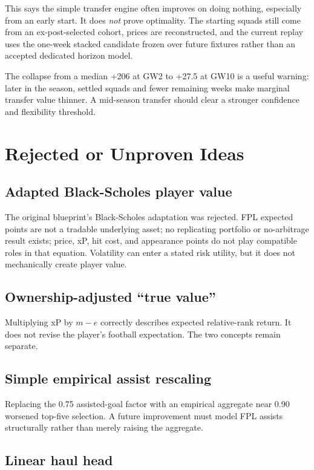 \documentclass[11pt,a4paper]{article}
\begin{document}
This says the simple transfer engine often improves on doing nothing, especially from an early start. It does \emph{not} prove optimality. The starting squads still come from an ex-post-selected cohort, prices are reconstructed, and the current replay uses the one-week stacked candidate frozen over future fixtures rather than an accepted dedicated horizon model.

The collapse from a median +206 at GW2 to +27.5 at GW10 is a useful warning: later in the season, settled squads and fewer remaining weeks make marginal transfer value thinner. A mid-season transfer should clear a stronger confidence and flexibility threshold.

\section{Rejected or Unproven Ideas}

\subsection{Adapted Black-Scholes player value}

The original blueprint's Black-Scholes adaptation was rejected. FPL expected points are not a tradable underlying asset; no replicating portfolio or no-arbitrage result exists; price, xP, hit cost, and appearance points do not play compatible roles in that equation. Volatility can enter a stated risk utility, but it does not mechanically create player value.

\subsection{Ownership-adjusted ``true value''}

Multiplying xP by $m-e$ correctly describes expected relative-rank return. It does not revise the player's football expectation. The two concepts remain separate.

\subsection{Simple empirical assist rescaling}

Replacing the 0.75 assisted-goal factor with an empirical aggregate near 0.90 worsened top-five selection. A future improvement must model FPL assists structurally rather than merely raising the aggregate.

\subsection{Linear haul head}
\end{document}
